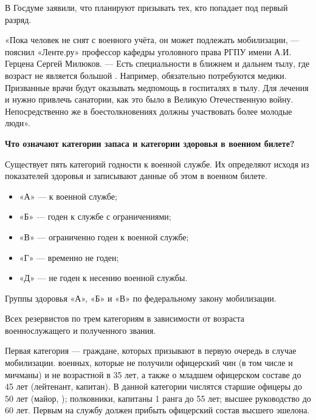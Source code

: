 В Госдуме заявили, что планируют призывать тех, кто попадает под первый разряд.

«Пока человек не снят с военного учёта, он может подлежать мобилизации, — пояснил «Ленте.ру» профессор кафедры уголовного права РГПУ имени А.И. Герцена Сергей Милюков. — Есть специальности в ближнем и дальнем тылу, где возраст не является большой . Например, обязательно потребуются медики. Призванные врачи будут оказывать медпомощь в госпиталях в тылу. Для лечения и  нужно привлечь санатории, как это было в Великую Отечественную войну. Непосредственно же в боестолкновениях должны участвовать более молодые люди».

\textbf{Что означают категории запаса и категории здоровья в военном билете? }

Существует пять категорий годности к военной службе. Их определяют исходя из показателей здоровья и записывают данные об этом в военном билете.
\begin{itemize}
    \item «А» —  к военной службе;
    \item «Б» — годен к службе с  ограничениями;
    \item «В» — ограниченно годен к военной службе;
    \item «Г» — временно не годен;
    \item «Д» — не годен к несению военной службы.
\end{itemize}
Группы здоровья «А», «Б» и «В» по федеральному закону  мобилизации.

Всех резервистов  по трем категориям в зависимости от возраста военнослужащего и полученного звания.

Первая категория — граждане, которых призывают в первую очередь в случае мобилизации.  военных, которые не получили офицерский чин (в том числе  и мичманы) и не  возрастной  в 35 лет, а также о младшем офицерском составе до 45 лет (лейтенант, капитан). В данной категории числятся старшие офицеры до 50 лет (майор, ); полковники, капитаны 1 ранга до 55 лет; высшее руководство до 60 лет. Первым на службу должен прибыть офицерский состав высшего эшелона.

